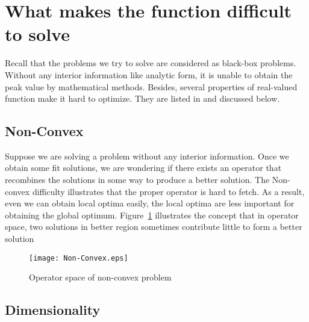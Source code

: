 \section{What makes the function difficult to solve}
\label{sec:problem difficulty}
Recall that the problems we try to solve are considered as black-box problems.
Without any interior information like analytic form, it is unable to
obtain the peak value by mathematical methods.
Besides, several properties of real-valued function make it hard to optimize.
They are listed in and discussed below.

\subsection{Non-Convex}

Suppose we are solving a problem without any interior information.
Once we obtain some fit solutions, we are wondering if there exists an
operator that recombines the solutions in some way to produce a
better solution.
The Non-convex difficulty illustrates that the proper operator is hard
to fetch.
As a result, even we can obtain local optima easily, the local optima
are less important for obtaining the global optimum.
Figure~\ref{fig:nonconvex} illustrates the concept that in operator space, two
solutions in better region sometimes contribute little to form a better
solution

\begin{figure}[]
  \centering
  \texttt{[image: Non-Convex.eps]}
  \caption{Operator space of non-convex problem}
  \label{fig:nonconvex}
\end{figure}



\subsection{Dimensionality}


